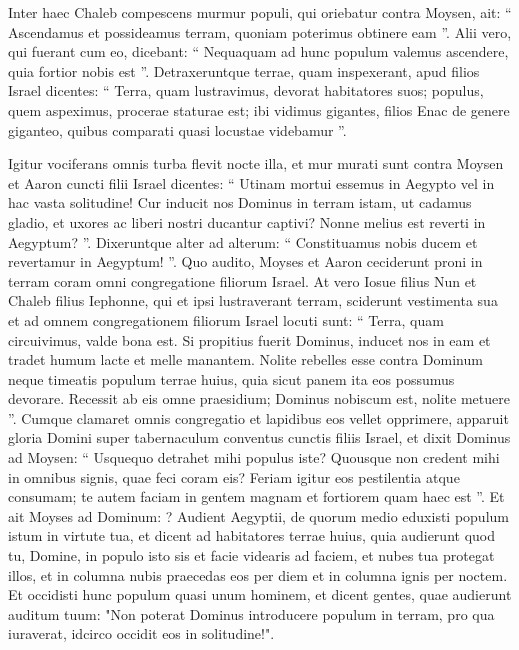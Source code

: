 \begin{biblechapter}
\begin{biblechapter}
\begin{biblechapter}
\begin{biblechapter}
\begin{biblechapter}
\begin{biblechapter}
\begin{biblechapter}
\begin{biblechapter}
\begin{biblechapter}
\begin{biblechapter}
\begin{biblechapter}
\begin{biblechapter}
\begin{biblechapter}
 \verse Inter haec Chaleb compescens murmur populi, qui oriebatur contra Moysen, ait: “ Ascendamus et possideamus terram, quoniam poterimus obtinere eam ”. 
\verse Alii vero, qui fuerant cum eo, dicebant: “ Nequaquam ad hunc populum valemus ascendere, quia fortior nobis est ”. 
\verse Detraxeruntque terrae, quam inspexerant, apud filios Israel dicentes: “ Terra, quam lustravimus, devorat habitatores suos; populus, quem aspeximus, procerae staturae est; 
\verse ibi vidimus gigantes, filios Enac de genere giganteo, quibus comparati quasi locustae videbamur ”.
 
\begin{biblechapter}
\verse Igitur vociferans omnis turba flevit nocte illa, 
\verse et mur murati sunt contra Moysen et Aaron cuncti filii Israel dicentes: “ Utinam mortui essemus in Aegypto vel in hac vasta solitudine! 
\verse Cur inducit nos Dominus in terram istam, ut cadamus gladio, et uxores ac liberi nostri ducantur captivi? Nonne melius est reverti in Aegyptum? ”. 
\verse Dixeruntque alter ad alterum: “ Constituamus nobis ducem et revertamur in Aegyptum! ”.
 \verse Quo audito, Moyses et Aaron ceciderunt proni in terram coram omni congregatione filiorum Israel. 
\verse At vero Iosue filius Nun et Chaleb filius Iephonne, qui et ipsi lustraverant terram, sciderunt vestimenta sua 
\verse et ad omnem congregationem filiorum Israel locuti sunt: “ Terra, quam circuivimus, valde bona est. 
\verse Si propitius fuerit Dominus, inducet nos in eam et tradet humum lacte et melle manantem. 
\verse Nolite rebelles esse contra Dominum neque timeatis populum terrae huius, quia sicut panem ita eos possumus devorare. Recessit ab eis omne praesidium; Dominus nobiscum est, nolite metuere ”.
 \verse Cumque clamaret omnis congregatio et lapidibus eos vellet opprimere, apparuit gloria Domini super tabernaculum conventus cunctis filiis Israel, 
\verse et dixit Dominus ad Moysen: “ Usquequo detrahet mihi populus iste? Quousque non credent mihi in omnibus signis, quae feci coram eis? 
\verse Feriam igitur eos pestilentia atque consumam; te autem faciam in gentem magnam et fortiorem quam haec est ”.
 \verse Et ait Moyses ad Dominum: ? Audient Aegyptii, de quorum medio eduxisti populum istum in virtute tua, 
\verse et dicent ad habitatores terrae huius, quia audierunt quod tu, Domine, in populo isto sis et facie videaris ad faciem, et nubes tua protegat illos, et in columna nubis praecedas eos per diem et in columna ignis per noctem. 
\verse Et occidisti hunc populum quasi unum hominem, et dicent gentes, quae audierunt auditum tuum: 
\verse "Non poterat Dominus introducere populum in terram, pro qua iuraverat, idcirco occidit eos in solitudine!". 

\end{biblechapter}
\end{biblechapter}
\end{biblechapter}
\end{biblechapter}
\end{biblechapter}
\end{biblechapter}
\end{biblechapter}
\end{biblechapter}
\end{biblechapter}
\end{biblechapter}
\end{biblechapter}
\end{biblechapter}
\end{biblechapter}
\end{biblechapter}
